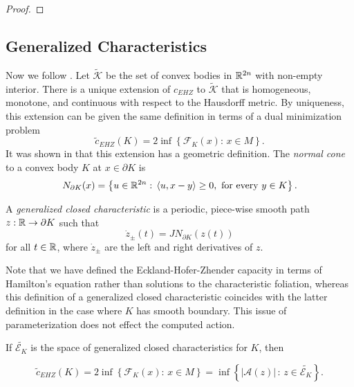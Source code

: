 \documentclass[../capacities_main.tex]{subfiles}
\begin{document}
	\begin{proof}
		
	\end{proof}
	
	\subsection{Generalized Characteristics}
	
	Now we follow \cite{artstein-avidan-ostrover}.  Let $\widetilde{\mathcal{K}}$ be the set of convex bodies in ${\mathbb R}^{2n}$ with non-empty interior.  There is a unique extension of $c_{EHZ}$ to $\widetilde{\mathcal{K}}$ that is homogeneous, monotone, and continuous with respect to the Hausdorff metric.  By uniqueness, this extension can be given the same definition in terms of a dual minimization problem \cite{artstein-avidan-ostrover}
	\begin{equation*}
	\tilde c_{EHZ}(K)  = 2\inf \left\{ \mathcal{F}_{K}(x) :\, x\in M\right\}.
	\end{equation*}
	It was shown in \cite{artstein-avidan-ostrover} that this extension has a geometric definition.  The \emph{normal cone} to a convex body $K$ at $x\in \partial K$ is 
	\begin{equation*}
	N_{\partial K}(x)  = \left\{ u \in {\mathbb R}^{2n} : \, \langle u, x-y \rangle \geq 0, \mbox{ for every } y \in K \right\}.
	\end{equation*} 
	\begin{Definition}
		A \emph{generalized closed characteristic} is a periodic, piece-wise smooth path $z: {\mathbb R} \rightarrow \partial K$ such that 
		\begin{equation*}
		\dot z_{\pm}(t) = JN_{\partial K}(z(t))
		\end{equation*} 
		for all $t\in {\mathbb R}$, where $\dot z_{\pm}$ are the left and right derivatives of $z$.
	\end{Definition}
	Note that we have defined the Eckland-Hofer-Zhender capacity in terms of Hamilton's equation rather than solutions to the characteristic foliation, whereas this definition of a generalized closed characteristic coincides with the latter definition in the case where $K$ has smooth boundary. This issue of parameterization does not effect the computed action.
	
	If $\widetilde{\mathcal{E}_K}$ is the space of generalized closed characteristics for $K$, then 
	\begin{Theorem}\cite{artstein-avidan-ostrover}
		\begin{equation*}
		\tilde c_{EHZ}(K) = 2\inf \left\{ \mathcal{F}_{K}(x) :\, x\in M\right\} = \inf\left\{ |\mathcal{A}(z)| \, :\, z \in \widetilde{\mathcal{E}_K}\right\}.
		\end{equation*}
	\end{Theorem}
	
	
\end{document}
